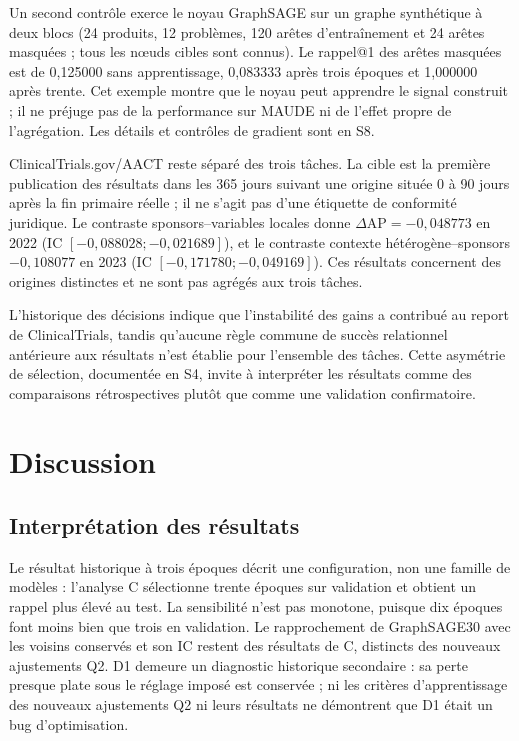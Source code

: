 Un second contrôle exerce le noyau GraphSAGE sur un graphe synthétique à deux blocs (24 produits, 12 problèmes, 120 arêtes d'entraînement et 24 arêtes masquées ; tous les nœuds cibles sont connus)\cite{hgbcode}. Le rappel@1 des arêtes masquées est de 0,125000 sans apprentissage, 0,083333 après trois époques et 1,000000 après trente. Cet exemple montre que le noyau peut apprendre le signal construit ; il ne préjuge pas de la performance sur MAUDE ni de l'effet propre de l'agrégation. Les détails et contrôles de gradient sont en S8.

ClinicalTrials.gov/AACT reste séparé des trois tâches. La cible est la première publication des résultats dans les 365 jours suivant une origine située 0 à 90 jours après la fin primaire réelle ; il ne s'agit pas d'une étiquette de conformité juridique. Le contraste sponsors--variables locales donne $\Delta\mathrm{AP}=-0,048773$ en 2022 (IC $[-0,088028;-0,021689]$), et le contraste contexte hétérogène--sponsors $-0,108077$ en 2023 (IC $[-0,171780;-0,049169]$)\cite{hgb2026,hgbhistory}. Ces résultats concernent des origines distinctes et ne sont pas agrégés aux trois tâches.

L'historique des décisions indique que l'instabilité des gains a contribué au report de ClinicalTrials, tandis qu'aucune règle commune de succès relationnel antérieure aux résultats n'est établie pour l'ensemble des tâches. Cette asymétrie de sélection, documentée en S4, invite à interpréter les résultats comme des comparaisons rétrospectives plutôt que comme une validation confirmatoire.

\section{Discussion}

\subsection{Interprétation des résultats}

Le résultat historique à trois époques décrit une configuration, non une famille de modèles : l'analyse C sélectionne trente époques sur validation et obtient un rappel plus élevé au test. La sensibilité n'est pas monotone, puisque dix époques font moins bien que trois en validation. Le rapprochement de GraphSAGE30 avec les voisins conservés et son IC restent des résultats de C, distincts des nouveaux ajustements Q2. D1 demeure un diagnostic historique secondaire : sa perte presque plate sous le réglage imposé est conservée ; ni les critères d'apprentissage des nouveaux ajustements Q2 ni leurs résultats ne démontrent que D1 était un bug d'optimisation.

